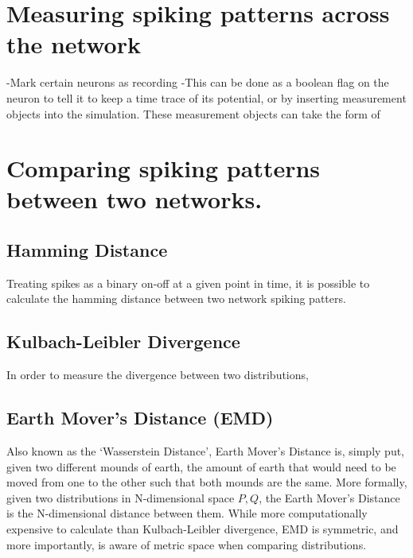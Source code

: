 \section{Measuring spiking patterns across the network}

-Mark certain neurons as recording
-This can be done as a boolean flag on the neuron to tell it to keep a time
trace of its potential, or by inserting measurement objects into the simulation.
These measurement objects can take the form of 

\section{Comparing spiking patterns between two networks.}

\subsection{Hamming Distance}
Treating spikes as a binary on-off at a given point in time, it is possible to
calculate the hamming distance between two network spiking patters. 

\subsection{Kulbach-Leibler Divergence}

In order to measure the divergence between two distributions, 

\subsection{Earth Mover's Distance (EMD)}

Also known as the `Wasserstein Distance', Earth Mover's Distance is, simply put,
given two different mounds of earth, the amount of earth that would need to be
moved from one to the other such that both mounds are the same. More formally,
given two distributions in N-dimensional space $P, Q$, the Earth Mover's
Distance is the N-dimensional distance between them. While more computationally
expensive to calculate than Kulbach-Leibler divergence, EMD is symmetric, and
more importantly, is aware of metric space when comparing distributions. 


